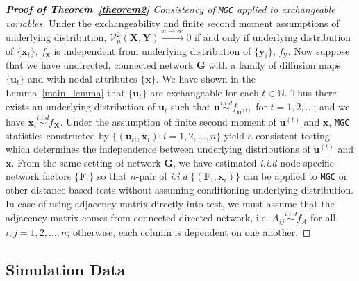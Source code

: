 \documentclass[11pt]{article}
\theoremstyle{definition}
\begin{document}
\begin{proof}[\textbf{Proof of Theorem~\ref{theorem2}} Consistency of \texttt{MGC} applied to exchangeable variables]
	
	Under the exchangeability and finite second moment assumptions of underlying distribution, $\mathcal{V}^{2}_{n}(\mathbf{X},\mathbf{Y}) \xrightarrow{n \rightarrow \infty}  0$ if and only if underlying distribution of $\{\mathbf{x}_{i} \}$, $f_{\mathbf{x}}$ is independent from underlying distribution of $\{ \mathbf{y}_{i}  \}$, $f_{\mathbf{y}}$. Now suppose that we have undirected, connected network $\mathbf{G}$ with a family of diffusion maps $\{ \mathbf{u}_{t}  \}$ and with nodal attributes $\{ \mathbf{x}  \}$. We have shown in the Lemma~\ref{main_lemma} that $\{ \mathbf{u}_{t}  \}$ are exchangeable for each $t \in \mathbb{N}$. Thus there exists an underlying distribution of $\mathbf{u}_{t}$ such that $\mathbf{u} \overset{i.i.d}{\sim} f_{\mathbf{u}^{(t)}}$ for $t= 1,2,\ldots $; and we have $\mathbf{x}_{i} \overset{i.i.d}{\sim} f_{\mathbf{X}}$. Under the assumption of finite second moment of $\mathbf{u}^{(t)}$ and $\mathbf{x}$, \texttt{MGC} statistics constructed by $\{  (  \mathbf{u}_{ti}, \mathbf{x}_{i} ) : i = 1,2,\ldots, n  \}$ yield a consistent testing which determines the independence between underlying distributions of $\mathbf{u}^{(t)}$ and $\mathbf{x}$. From the same setting of network $\mathbf{G}$, we have estimated \textit{i.i.d} node-specific network factors $\{ \mathbf{F}_{i} \}$ so that $n$-pair of \textit{i.i.d} $\{ ( \mathbf{F}_{i}, \mathbf{x}_{i} )  \}$ can be applied to \texttt{MGC} or other distance-based tests without assuming conditioning underlying distribution. In case of using adjacency matrix directly into test, we must assume that the adjacency matrix comes from connected directed network, i.e. $A_{ij} \overset{i.i.d}{\sim} f_{A}$ for all $i,j=1,2,\ldots, n$; otherwise, each column is dependent on one another.  
\end{proof}

\subsection{Simulation Data}
\label{ssec:models}
\end{document}
